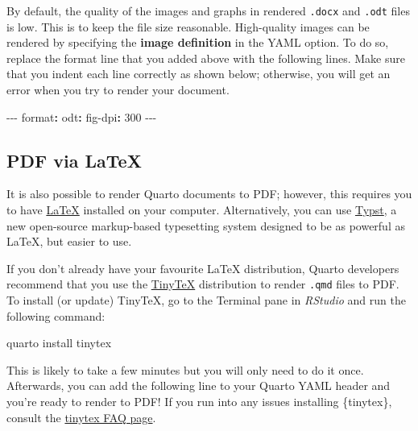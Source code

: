 \documentclass[
  letterpaper,
  DIV=11,
  numbers=noendperiod]{scrreprt}
\newenvironment{Shaded}{\begin{snugshade}}{\end{snugshade}}
\newcommand{\AttributeTok}[1]{\textcolor[rgb]{0.40,0.45,0.13}{#1}}
\newcommand{\DecValTok}[1]{\textcolor[rgb]{0.68,0.00,0.00}{#1}}
\newcommand{\FunctionTok}[1]{\textcolor[rgb]{0.28,0.35,0.67}{#1}}
\newcommand{\KeywordTok}[1]{\textcolor[rgb]{0.00,0.23,0.31}{\textbf{#1}}}
\newcommand{\NormalTok}[1]{\textcolor[rgb]{0.00,0.23,0.31}{#1}}
\newcommand{\PreprocessorTok}[1]{\textcolor[rgb]{0.68,0.00,0.00}{#1}}
\begin{document}
By default, the quality of the images and graphs in rendered
\texttt{.docx} and \texttt{.odt} files is low. This is to keep the file
size reasonable. High-quality images can be rendered by specifying the
\textbf{image definition} in the YAML option. To do so, replace the
format line that you added above with the following lines. Make sure
that you indent each line correctly as shown below; otherwise, you will
get an error when you try to render your document.

\begin{Shaded}
\begin{Highlighting}[]
\PreprocessorTok{{-}{-}{-}}
\FunctionTok{format}\KeywordTok{:}\AttributeTok{ }
\AttributeTok{  }\FunctionTok{odt}\KeywordTok{:}
\AttributeTok{    }\FunctionTok{fig{-}dpi}\KeywordTok{:}\AttributeTok{ }\DecValTok{300}
\PreprocessorTok{{-}{-}{-}}
\end{Highlighting}
\end{Shaded}

\subsection{\texorpdfstring{PDF via {\LaTeX}}{PDF via }}\label{sec-PDF}

It is also possible to render Quarto documents to PDF; however, this
requires you to have \href{https://en.wikipedia.org/wiki/LaTeX}{LaTeX}
installed on your computer. Alternatively, you can use
\href{https://quarto.org/docs/output-formats/typst.html}{Typst}, a new
open-source markup-based typesetting system designed to be as powerful
as {\LaTeX}, but easier to use.

If you don't already have your favourite {\LaTeX} distribution, Quarto
developers recommend that you use the
\href{https://yihui.org/tinytex/}{TinyTeX} distribution to render
\texttt{.qmd} files to PDF. To install (or update) TinyTeX, go to the
Terminal pane in \emph{RStudio} and run the following command:

\begin{Shaded}
\begin{Highlighting}[]
\NormalTok{quarto install tinytex}
\end{Highlighting}
\end{Shaded}

This is likely to take a few minutes but you will only need to do it
once. Afterwards, you can add the following line to your Quarto YAML
header and you're ready to render to PDF! If you run into any issues
installing \{tinytex\}, consult the
\href{https://yihui.org/tinytex/faq/}{tinytex FAQ page}.
\end{document}
